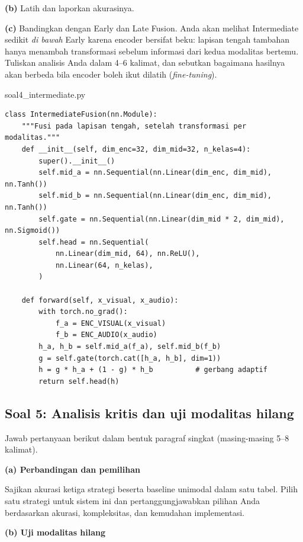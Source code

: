 \documentclass[12pt, a4paper]{article}
\begin{document}
\textbf{(b)} Latih dan laporkan akurasinya.

\textbf{(c)} Bandingkan dengan Early dan Late Fusion. Anda akan melihat Intermediate
sedikit \emph{di bawah} Early karena encoder bersifat beku: lapisan tengah tambahan hanya
menambah transformasi sebelum informasi dari kedua modalitas bertemu. Tuliskan analisis
Anda dalam 4--6 kalimat, dan sebutkan bagaimana hasilnya akan berbeda bila encoder boleh
ikut dilatih (\emph{fine-tuning}).

\begin{codewindow}{soal4\_intermediate.py}
\begin{lstlisting}[style=pycode]
class IntermediateFusion(nn.Module):
    """Fusi pada lapisan tengah, setelah transformasi per modalitas."""
    def __init__(self, dim_enc=32, dim_mid=32, n_kelas=4):
        super().__init__()
        self.mid_a = nn.Sequential(nn.Linear(dim_enc, dim_mid), nn.Tanh())
        self.mid_b = nn.Sequential(nn.Linear(dim_enc, dim_mid), nn.Tanh())
        self.gate = nn.Sequential(nn.Linear(dim_mid * 2, dim_mid), nn.Sigmoid())
        self.head = nn.Sequential(
            nn.Linear(dim_mid, 64), nn.ReLU(),
            nn.Linear(64, n_kelas),
        )

    def forward(self, x_visual, x_audio):
        with torch.no_grad():
            f_a = ENC_VISUAL(x_visual)
            f_b = ENC_AUDIO(x_audio)
        h_a, h_b = self.mid_a(f_a), self.mid_b(f_b)
        g = self.gate(torch.cat([h_a, h_b], dim=1))
        h = g * h_a + (1 - g) * h_b          # gerbang adaptif
        return self.head(h)
\end{lstlisting}
\end{codewindow}

\subsection{Soal 5: Analisis kritis dan uji modalitas hilang}
\label{sec:soal5}

Jawab pertanyaan berikut dalam bentuk paragraf singkat (masing-masing 5--8 kalimat).

\textbf{(a) Perbandingan dan pemilihan}

Sajikan akurasi ketiga strategi beserta baseline unimodal dalam satu tabel. Pilih satu
strategi untuk sistem ini dan pertanggungjawabkan pilihan Anda berdasarkan akurasi,
kompleksitas, dan kemudahan implementasi.

\textbf{(b) Uji modalitas hilang}
\end{document}

